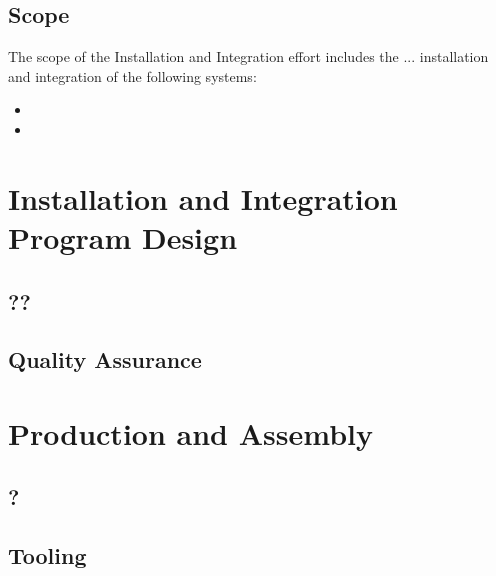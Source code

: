 \subsection{Scope}
\label{sec:fdsp-install-scope}

The scope of the Installation and Integration effort includes the ...  installation and integration of the following systems: 


\begin{itemize}
\item  
\item 
\end{itemize}



\section{Installation and Integration Program Design}
\label{sec:fdsp-install-design}


\subsection{??}
\label{sec:fdsp-install-??}

\subsection{Quality Assurance}
\label{sec:fdsp-install-qa}




\section{Production and Assembly}
\label{sec:fdsp-install-prod-assy}

\subsection{?}
\label{sec:fdsp-install-?}



\subsection{Tooling}
\label{sec:fdsp-install-tooling}


